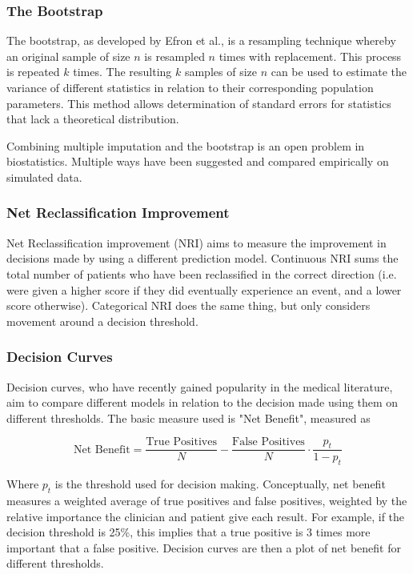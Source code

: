 \documentclass[a4paper,12pt]{article}
\begin{document}
		\subsubsection{The Bootstrap}
		The bootstrap, as developed by Efron et al.\cite{BradleyEfron1994}, is a resampling technique whereby an original sample of size $ n $ is resampled $ n $ times with replacement. This process is repeated $ k $ times. The resulting $ k  $ samples of size $ n  $ can be used to estimate the variance of different statistics in relation to their corresponding population parameters. This method allows determination of standard errors for statistics that lack a theoretical distribution.
		
		Combining multiple imputation and the bootstrap is an open problem in biostatistics. Multiple ways have been suggested and compared empirically on simulated data\cite{Schomaker2016}.
		
		\subsubsection{Net Reclassification Improvement}
		Net Reclassification improvement (NRI) aims to measure the improvement in decisions made by using a different prediction model\cite{Pencina2008}. Continuous NRI sums the total number of patients who have been reclassified in the correct direction (i.e. were given a higher score if they did eventually experience an event, and a lower score otherwise). Categorical NRI does the same thing, but only considers movement around a decision threshold.
		
		\subsubsection{Decision Curves}
		Decision curves, who have recently gained popularity in the medical literature\cite{Vickers2016}, aim to compare different models in relation to the decision made using them on different thresholds. The basic measure used is "Net Benefit", measured as
		
		\begin{equation*}
		\text{Net Benefit} = \frac{\text{True Positives}}{N} - \frac{\text{False Positives}}{N} \cdot \frac{p_t}{1-p_t}
		\end{equation*}
		
		Where $ p_t $ is the threshold used for decision making. Conceptually, net benefit measures a weighted average of true positives and false positives, weighted by the relative importance the clinician and patient give each result. For example, if the decision threshold is 25\%, this implies that a true positive is 3 times more important that a false positive. Decision curves are then a plot of net benefit for different thresholds.
		
\end{document}

